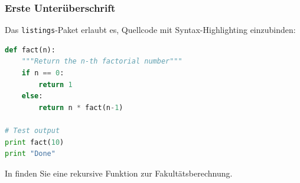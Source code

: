 \subsubsection{Erste Unterüberschrift}
\label{sec:ErsteUnterueberschrift}

Das \texttt{listings}-Paket erlaubt es, Quellcode mit Syntax-Highlighting einzubinden:

\begin{lstlisting}[language=Python,float=ht,caption={Python-Programm zur Berechnung der Fakultätsfunktion},label=lst:factorial]
def fact(n):
    """Return the n-th factorial number"""
    if n == 0:
        return 1
    else:
        return n * fact(n-1)
  
# Test output
print fact(10)
print "Done"
\end{lstlisting}

In  finden Sie eine rekursive Funktion zur Fakultätsberechnung.


\printbibliography[heading=bibintoc]






